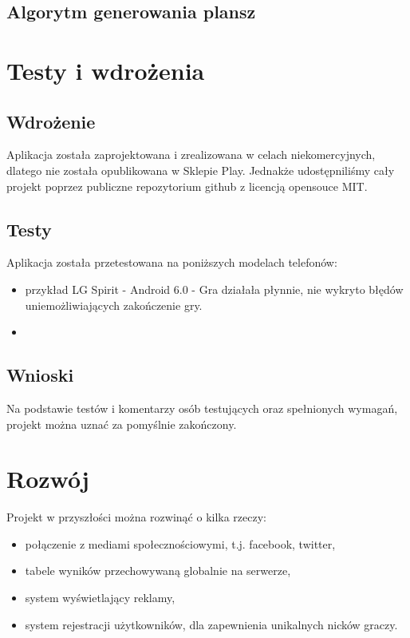 \documentclass[a4paper, 11pt]{article}
\begin{document}
\subsection{Algorytm generowania plansz}

\vfill
\newpage
\section{Testy i wdrożenia}
\subsection{Wdrożenie}
Aplikacja została zaprojektowana i zrealizowana w celach niekomercyjnych, dlatego nie została opublikowana w Sklepie Play. Jednakże udostępniliśmy cały projekt poprzez publiczne repozytorium github z licencją opensouce MIT.
\subsection{Testy}
Aplikacja została przetestowana na poniższych modelach telefonów:
\begin{itemize}
\item przykład LG Spirit - Android 6.0 - Gra działała płynnie, nie wykryto błędów uniemożliwiających zakończenie gry.
\item
\end{itemize}

\subsection{Wnioski}
Na podstawie testów i komentarzy osób testujących oraz spełnionych wymagań, projekt można uznać za pomyślnie zakończony.


\vfill
\newpage
\section{Rozwój}
Projekt w przyszłości można rozwinąć o kilka rzeczy:
\begin{itemize}
\item połączenie z mediami społecznościowymi, t.j. facebook, twitter,
\item tabele wyników przechowywaną globalnie na serwerze,
\item system wyświetlający reklamy,
\item system rejestracji użytkowników, dla zapewnienia unikalnych nicków graczy.
\end{itemize}

	
\end{document}
